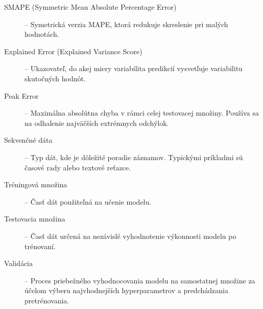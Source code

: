 \documentclass[]{KKUIzaverecnaPraca}
\begin{document}
\begin{description}
    \item [SMAPE (Symmetric Mean Absolute Percentage Error)] – Symetrická verzia MAPE, ktorá redukuje skreslenie pri malých hodnotách.

    \item [Explained Error (Explained Variance Score)] – Ukazovateľ, do akej miery variabilita predikcií vysvetľuje variabilitu skutočných hodnôt.

    \item [Peak Error] – Maximálna absolútna chyba v rámci celej testovacej množiny. Používa sa na odhalenie najväčších extrémnych odchýlok.

    \item [Sekvenčné dáta] – Typ dát, kde je dôležité poradie záznamov. Typickými príkladmi sú časové rady alebo textové reťazce.

    \item [Tréningová množina] – Časť dát použiteľná na učenie modelu.

    \item [Testovacia množina] – Časť dát určená na nezávislé vyhodnotenie výkonnosti modelu po trénovaní.

    \item [Validácia] – Proces priebežného vyhodnocovania modelu na samostatnej množine za účelom výberu najvhodnejších hyperparametrov a predchádzania pretrénovania.
\end{description}

\kslovnikterminov







\end{document}
